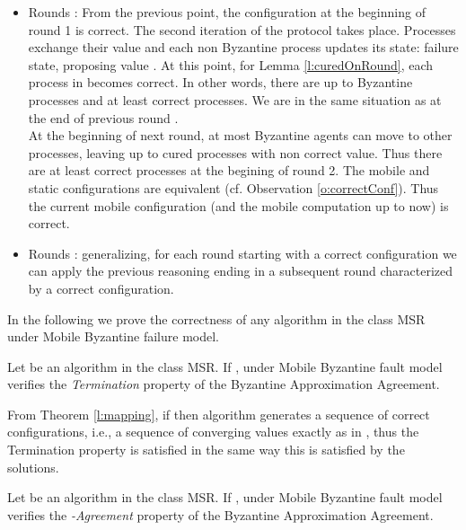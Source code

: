 \begin{proofT}
\begin{itemize}
\item{Rounds :} From the previous point, the configuration at the beginning of round 1 is correct. The second iteration of the protocol takes place. Processes exchange their value and each non Byzantine process  updates its state: failure state, proposing value . At this point, for Lemma \ref{l:curedOnRound}, each process in  becomes correct. In other words, there are up to  Byzantine processes and at least  correct processes. We are in the same situation as at the end of previous round .\\
At the beginning of next round, at most  Byzantine agents can move to other processes, leaving up to  cured processes with non correct value. 
Thus there are at least  correct processes at the begining of round 2. The mobile and static configurations are equivalent (cf. Observation \ref{o:correctConf}). Thus the current mobile configuration (and the mobile computation up to now) is correct.
\item{Rounds :} generalizing, for each round starting with a correct configuration we can apply the previous reasoning ending in a subsequent round characterized by a correct configuration.
\end{itemize}
\renewcommand{\toto}{l:mapping}
\end{proofT}


In the following we prove the correctness of any algorithm in the class MSR under Mobile Byzantine failure model.
\begin{lemma}[Termination]\label{l:termination}
	Let  be an algorithm in the class MSR.   If ,  under Mobile Byzantine fault model verifies the \emph{Termination} property of the Byzantine Approximation Agreement.
\end{lemma}

\begin{proofL}
From Theorem \ref{l:mapping}, if  then algorithm  generates a sequence of correct configurations, i.e., a sequence of converging values exactly as in \cite{DLPS86,KA94}, thus the Termination property is satisfied in the same way this is satisfied by the \cite{DLPS86,KA94} solutions.	
	\renewcommand{\toto}{l:termination}
\end{proofL}

\begin{lemma}[-Agreement]\label{l:agreement}
Let  be an algorithm in the class MSR.   If ,  under Mobile Byzantine fault model verifies the \emph{-Agreement} property of the Byzantine Approximation Agreement.
\end{lemma}

